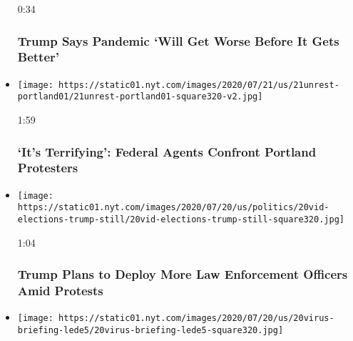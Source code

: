 \begin{itemize}
  0:34

  \hypertarget{trump-says-pandemic-will-get-worse-before-it-gets-better}{%
  \subsubsection{Trump Says Pandemic `Will Get Worse Before It Gets
  Better'}\label{trump-says-pandemic-will-get-worse-before-it-gets-better}}
\item
  \href{https://www.nytimes.com/video/us/100000007248945/portland-protests-federal-agents.html?action=click\&module=video-series-bar\&region=header\&pgtype=Article\&playlistId=video/u-s}{}

  \texttt{[image: https://static01.nyt.com/images/2020/07/21/us/21unrest-portland01/21unrest-portland01-square320-v2.jpg]}

  1:59

  \hypertarget{its-terrifying-federal-agents-confront-portland-protesters}{%
  \subsubsection{`It's Terrifying': Federal Agents Confront Portland
  Protesters}\label{its-terrifying-federal-agents-confront-portland-protesters}}
\item
  \href{https://www.nytimes.com/video/us/100000007247868/trump-deploy-federal-agents.html?action=click\&module=video-series-bar\&region=header\&pgtype=Article\&playlistId=video/u-s}{}

  \texttt{[image: https://static01.nyt.com/images/2020/07/20/us/politics/20vid-elections-trump-still/20vid-elections-trump-still-square320.jpg]}

  1:04

  \hypertarget{trump-plans-to-deploy-more-law-enforcement-officers-amid-protests}{%
  \subsubsection{Trump Plans to Deploy More Law Enforcement Officers
  Amid
  Protests}\label{trump-plans-to-deploy-more-law-enforcement-officers-amid-protests}}
\item
  \href{https://www.nytimes.com/video/us/100000007247407/trump-will-resume-virus-briefings.html?action=click\&module=video-series-bar\&region=header\&pgtype=Article\&playlistId=video/u-s}{}

  \texttt{[image: https://static01.nyt.com/images/2020/07/20/us/20virus-briefing-lede5/20virus-briefing-lede5-square320.jpg]}


\end{itemize}

